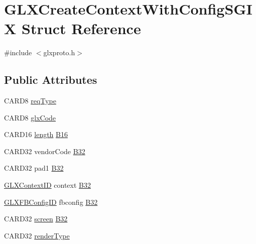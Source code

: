 \hypertarget{struct_g_l_x_create_context_with_config_s_g_i_x}{}\section{G\+L\+X\+Create\+Context\+With\+Config\+S\+G\+IX Struct Reference}
\label{struct_g_l_x_create_context_with_config_s_g_i_x}


{\ttfamily \#include $<$glxproto.\+h$>$}

\subsection*{Public Attributes}
\begin{DoxyCompactItemize}
\item 
C\+A\+R\+D8 \hyperlink{struct_g_l_x_create_context_with_config_s_g_i_x_aabf7cd86c2e9fc2cb2be203f0c4a6177}{req\+Type}
\item 
C\+A\+R\+D8 \hyperlink{struct_g_l_x_create_context_with_config_s_g_i_x_a7b6edf28fd6eb4a39ebe7f3052ed8350}{glx\+Code}
\item 
C\+A\+R\+D16 \hyperlink{glcorearb_8h_ab9c919755bde3b34349e23a32b4e0fa7}{length} \hyperlink{struct_g_l_x_create_context_with_config_s_g_i_x_affb394db800ab46e09ecf441f308f74d}{B16}
\item 
C\+A\+R\+D32 vendor\+Code \hyperlink{struct_g_l_x_create_context_with_config_s_g_i_x_a4c2fe092046061d7832ce37da931aede}{B32}
\item 
C\+A\+R\+D32 pad1 \hyperlink{struct_g_l_x_create_context_with_config_s_g_i_x_a09efb88bdc05057ed6664f8521afe327}{B32}
\item 
\hyperlink{glx_8h_a17c7ca5b76cc448032df0b5352803005}{G\+L\+X\+Context\+ID} context \hyperlink{struct_g_l_x_create_context_with_config_s_g_i_x_ada0fa9991ec4e9758c6b6ec11dc03c85}{B32}
\item 
\hyperlink{glx_8h_a38e78acefebf732d1a0da441ad1de05f}{G\+L\+X\+F\+B\+Config\+ID} fbconfig \hyperlink{struct_g_l_x_create_context_with_config_s_g_i_x_a86f426a8ed05d76ada00cd0a0169b670}{B32}
\item 
C\+A\+R\+D32 \hyperlink{cad_8h_ae04e09e4e3831bfc1632c509ae37dcec}{screen} \hyperlink{struct_g_l_x_create_context_with_config_s_g_i_x_a768f58970b3daacb5c0dddc26ad027f8}{B32}
\item 
C\+A\+R\+D32 \hyperlink{struct_g_l_x_create_context_with_config_s_g_i_x_a9569206c7f77caa65a2cbc67712fd160}{render\+Type}
\item 

\end{DoxyCompactItemize}
